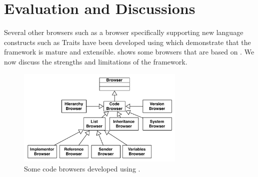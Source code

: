 \documentclass[a4paper,10pt,twoside]{book}
\begin{document}


\section{Evaluation and Discussions} 

Several other browsers such as a browser specifically supporting new language constructs such as Traits have been developed using \ob which demonstrate that the framework is mature and extensible.  shows some browsers that are based on \ob. We now discuss the strengths and limitations of the framework.



\begin{figure}
\begin{center}
\includegraphics[width=8cm]{BrowserFamily}
\caption{Some code browsers developed using \obf.}\label{fig:browsers}
\end{center}
\end{figure}
\end{document}
